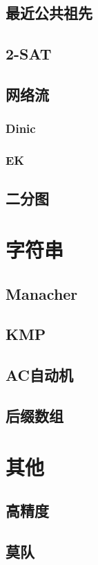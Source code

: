 \documentclass[12pt,a4paper]{article}
\begin{document}
\subsection{最近公共祖先}
\subsection{2-SAT}
\subsection{网络流}
\subsubsection{Dinic}
\begin{spacing}{1.5}

\end{spacing}

\subsubsection{EK}

\subsection{二分图}
\section{字符串}
\subsection{Manacher}

\subsection{KMP}

\subsection{AC自动机}
\subsection{后缀数组}
\section{其他}
\subsection{高精度}

\subsection{莫队}
\end{document}
